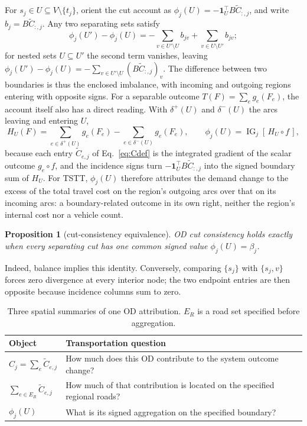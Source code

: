\documentclass[a4paper,fleqn]{cas-sc}
\newtheorem*{uproposition}{Proposition}
\begin{document}
For $s_j\in U\subseteq V\setminus\{t_j\}$, orient the cut account as
$\phi_j(U)=-\mathbf1_U^\top B\widetilde C_{:,j}$, and write
$b_j=B\widetilde C_{:,j}$. Any two separating sets satisfy
\begin{equation}
\phi_j(U')-\phi_j(U)
=-\sum_{v\in U'\setminus U}b_{jv}
+\sum_{v\in U\setminus U'}b_{jv};
\label{eq:cutdiff}
\end{equation}
for nested sets $U\subseteq U'$ the second term vanishes, leaving
$\phi_j(U')-\phi_j(U)=-\sum_{v\in U'\setminus U}(B\widetilde C_{:,j})_v$.
The difference between two boundaries is thus the enclosed imbalance,
with incoming and outgoing regions entering with opposite signs.
For a separable outcome $T(F)=\sum_e g_e(F_e)$, the account itself
also has a direct reading. With $\delta^+(U)$ and $\delta^-(U)$ the
arcs leaving and entering $U$,
\begin{equation}
H_U(F)=\sum_{e\in\delta^+(U)}g_e(F_e)-\sum_{e\in\delta^-(U)}g_e(F_e),
\qquad
\phi_j(U)=\operatorname{IG}_j[\,H_U\circ f\,],
\label{eq:hboundary}
\end{equation}
because each entry $\widetilde C_{e,j}$ of Eq.~\eqref{eq:Cdef} is the
integrated gradient of the scalar outcome $g_e\circ f$, and the
incidence signs turn $-\mathbf 1_U^\top B\widetilde C_{:,j}$ into the
signed boundary sum of $H_U$. For TSTT, $\phi_j(U)$ therefore
attributes the demand change to the excess of the total travel cost on
the region's outgoing arcs over that on its incoming arcs: a
boundary-related outcome in its own right, neither the region's
internal cost nor a vehicle count.
\begin{uproposition}[cut-consistency equivalence]\label{par:cutequiv}
OD cut consistency holds exactly when every separating cut has one common
signed value $\phi_j(U)=\beta_j$.
\end{uproposition}
Indeed, balance implies this identity. Conversely, comparing $\{s_j\}$
with $\{s_j,v\}$ forces zero divergence at every interior node; the two
endpoint entries are then opposite because incidence columns sum to zero.

\begin{table}[pos=tb]
\footnotesize
\caption{Three spatial summaries of one OD attribution. $E_R$ is a road set
specified before aggregation.}\label{tab:objects}
\begin{tabular*}{\tblwidth}{@{}p{5cm}p{9cm}@{}}
\toprule Object & Transportation question\\\midrule
$C_j=\sum_e\widetilde C_{e,j}$ & How much does this OD contribute to the system outcome change?\\
$\sum_{e\in E_R}\widetilde C_{e,j}$ & How much of that contribution is located on the specified regional roads?\\
$\phi_j(U)$ & What is its signed aggregation on the specified boundary?\\
\bottomrule\end{tabular*}\end{table}
\end{document}

